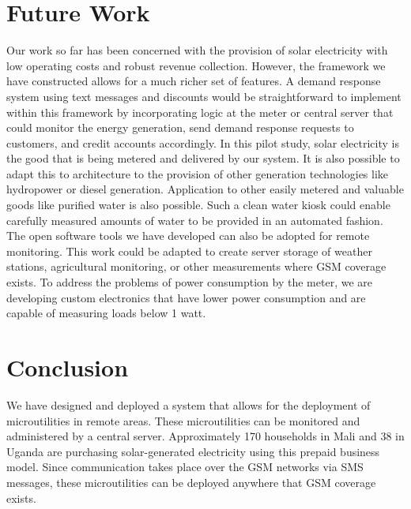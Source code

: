 \documentclass{sig-alternate}
\begin{document}
\section{Future Work}
Our work so far has been concerned with the
provision of solar electricity with low operating costs and robust revenue
collection.
However, the framework we have constructed allows for a much
richer set of features.
A demand response system using text messages and discounts
would be straightforward to implement within this framework
by incorporating logic at the meter or central server that
could monitor the energy generation, send demand response
requests to customers, and credit accounts accordingly.
In this pilot study, solar electricity is the good that
is being metered and delivered by our
system.
It is also possible to adapt this to architecture
to the provision of other generation technologies like hydropower or
diesel generation.  
Application to other easily metered and valuable goods
like purified water is also possible.
Such a clean water kiosk could enable carefully measured amounts 
of water to be provided in an automated fashion.
The open software tools we have developed can also be adopted for
remote monitoring.  
This work could be adapted to create server storage of weather stations,
agricultural monitoring, or other measurements where GSM coverage exists.
To address the problems of power consumption by the meter,
we are developing custom electronics that have lower power consumption
and are capable of measuring loads below 1 watt.



\section{Conclusion}
We have designed and deployed a system that allows for the deployment
of microutilities in remote areas.  
These microutilities can be monitored
and administered by a central server.  
Approximately 170 households in Mali and 38 in Uganda are purchasing 
solar-generated electricity using this prepaid business model. 
Since communication takes place
over the GSM networks via SMS messages, these microutilities can be
deployed anywhere that GSM coverage exists.



\end{document}
